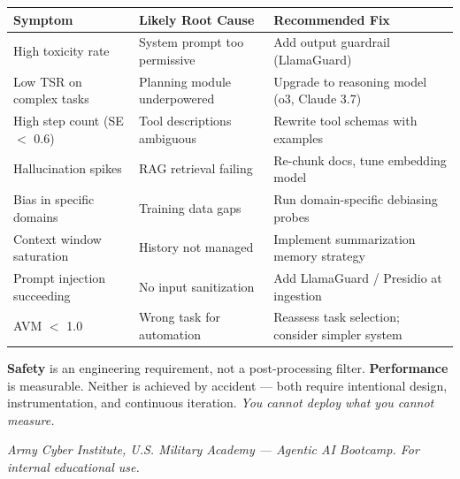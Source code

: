 \documentclass[12pt, letterpaper]{article}
\begin{document}
\begin{center}
\begin{tabular}{@{}p{3.5cm}p{4cm}p{5cm}@{}}
    \toprule
    \textbf{Symptom} & \textbf{Likely Root Cause} & \textbf{Recommended Fix} \\
    \midrule
    High toxicity rate & System prompt too permissive & Add output guardrail (LlamaGuard) \\
    Low TSR on complex tasks & Planning module underpowered & Upgrade to reasoning model (o3, Claude 3.7) \\
    High step count (SE $<$ 0.6) & Tool descriptions ambiguous & Rewrite tool schemas with examples \\
    Hallucination spikes & RAG retrieval failing & Re-chunk docs, tune embedding model \\
    Bias in specific domains & Training data gaps & Run domain-specific debiasing probes \\
    Context window saturation & History not managed & Implement summarization memory strategy \\
    Prompt injection succeeding & No input sanitization & Add LlamaGuard / Presidio at ingestion \\
    AVM $<$ 1.0 & Wrong task for automation & Reassess task selection; consider simpler system \\
    \bottomrule
\end{tabular}
\end{center}

\vspace{0.3cm}
\begin{tcolorbox}[notebox, title={Key Principle}]
    \textbf{Safety} is an engineering requirement, not a post-processing filter. \textbf{Performance} is measurable. Neither is achieved by accident --- both require intentional design, instrumentation, and continuous iteration. \textit{You cannot deploy what you cannot measure.}
\end{tcolorbox}

\vspace{0.5cm}
\footnotesize\color{slategray}
\textit{Army Cyber Institute, U.S. Military Academy --- Agentic AI Bootcamp. For internal educational use.}
\end{document}
